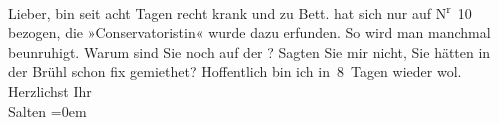 \begin{ledgroupsized}[t]{13cm}
           \pstart
           Lieber, bin seit acht Tagen recht krank und zu Bett. \label{K_L03324-2v}\label{K_L03324-2h} hat sich nur auf
                  N\textsuperscript{r} 10 bezogen, die »Conservatoristin« wurde dazu
               erfunden. So wird man manchmal beunruhigt. Warum sind Sie noch auf der \label{K_L03324-3v}\label{K_L03324-3h}? Sagten Sie mir nicht, Sie hätten in der Brühl schon fix gemiethet?\pend
           \pstart
           Hoffentlich bin ich in 8 Tagen wieder wol.\pend
           \pstart
           Herzlichst Ihr{\\[\baselineskip]}\spacefill\mbox{Salten}\pend
           \leftskip=0em{}
         
         \endnumbering{}\end{ledgroupsized}  \newcommand{\dateiname}{L03324}\newcommand{\titel}{Felix Salten an Arthur Schnitzler, [10?. 3. 1902]}\newcommand{\editorInnen}{Martin Anton Müller und Laura Untner}
      